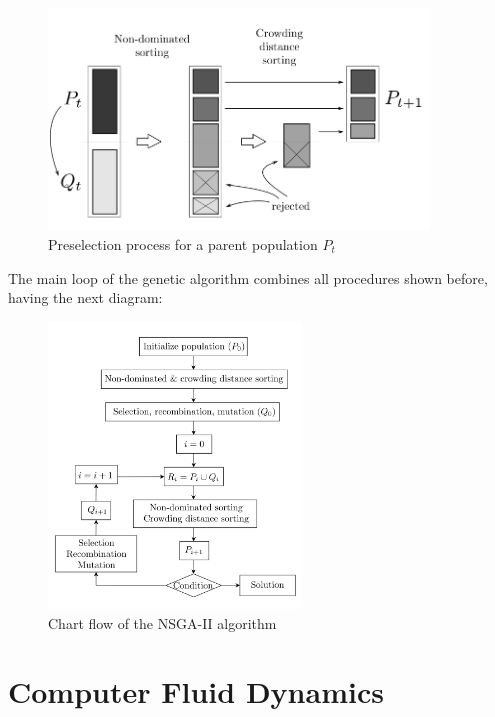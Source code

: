 \begin{itemize}
        \begin{figure}[h!]
        \centering
        \includegraphics[width=0.9\textwidth]{Figures/2/preselection5Report.png}
        \caption{Preselection process for a parent population $P_t$}
        \label{fig:preselection process}
    \end{figure}
\end{itemize}
    
The main loop of the genetic algorithm combines all procedures shown before, having the next diagram:

\begin{figure}[h!]
        \centering
        \includegraphics[width=0.6\textwidth]{Figures/2/NSGAflow.png}
        \caption{Chart flow of the NSGA-II algorithm }
        \label{fig:chartFlowNSGAII}
\end{figure}

\newpage

\section{Computer Fluid Dynamics}

